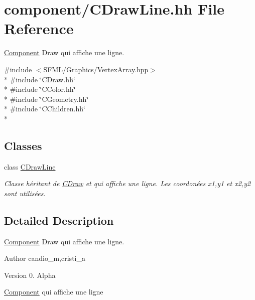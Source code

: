 \hypertarget{_c_draw_line_8hh}{}\section{component/\+C\+Draw\+Line.hh File Reference}
\label{_c_draw_line_8hh}


\hyperlink{class_component}{Component} Draw qui affiche une ligne.  


{\ttfamily \#include $<$S\+F\+M\+L/\+Graphics/\+Vertex\+Array.\+hpp$>$}\\*
{\ttfamily \#include \char`\"{}C\+Draw.\+hh\char`\"{}}\\*
{\ttfamily \#include \char`\"{}C\+Color.\+hh\char`\"{}}\\*
{\ttfamily \#include \char`\"{}C\+Geometry.\+hh\char`\"{}}\\*
{\ttfamily \#include \char`\"{}C\+Children.\+hh\char`\"{}}\\*
\subsection*{Classes}
\begin{DoxyCompactItemize}
\item 
class \hyperlink{class_c_draw_line}{C\+Draw\+Line}
\begin{DoxyCompactList}\small\item\em Classe héritant de \hyperlink{class_c_draw}{C\+Draw} et qui affiche une ligne. Les coordonées x1,y1 et x2,y2 sont utilisées. \end{DoxyCompactList}\end{DoxyCompactItemize}


\subsection{Detailed Description}
\hyperlink{class_component}{Component} Draw qui affiche une ligne. 

\begin{DoxyAuthor}{Author}
candio\+\_\+m,cristi\+\_\+a 
\end{DoxyAuthor}
\begin{DoxyVersion}{Version}
0. Alpha
\end{DoxyVersion}
\hyperlink{class_component}{Component} qui affiche une ligne 